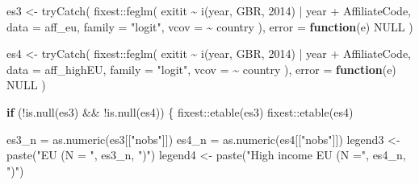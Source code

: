 \documentclass[
]{article}
\newenvironment{Shaded}{\begin{snugshade}}{\end{snugshade}}
\newcommand{\AttributeTok}[1]{\textcolor[rgb]{0.77,0.63,0.00}{#1}}
\newcommand{\ConstantTok}[1]{\textcolor[rgb]{0.00,0.00,0.00}{#1}}
\newcommand{\ControlFlowTok}[1]{\textcolor[rgb]{0.13,0.29,0.53}{\textbf{#1}}}
\newcommand{\DecValTok}[1]{\textcolor[rgb]{0.00,0.00,0.81}{#1}}
\newcommand{\FunctionTok}[1]{\textcolor[rgb]{0.00,0.00,0.00}{#1}}
\newcommand{\NormalTok}[1]{#1}
\newcommand{\OtherTok}[1]{\textcolor[rgb]{0.56,0.35,0.01}{#1}}
\newcommand{\SpecialCharTok}[1]{\textcolor[rgb]{0.00,0.00,0.00}{#1}}
\newcommand{\StringTok}[1]{\textcolor[rgb]{0.31,0.60,0.02}{#1}}
\begin{document}
\begin{Shaded}
\begin{Highlighting}[]
\NormalTok{es3 }\OtherTok{\textless{}{-}} \FunctionTok{tryCatch}\NormalTok{(}
\NormalTok{  fixest}\SpecialCharTok{::}\FunctionTok{feglm}\NormalTok{(}
\NormalTok{    exitit }\SpecialCharTok{\textasciitilde{}} \FunctionTok{i}\NormalTok{(year, GBR, }\DecValTok{2014}\NormalTok{) }\SpecialCharTok{|}\NormalTok{ year }\SpecialCharTok{+}\NormalTok{ AffiliateCode,}
    \AttributeTok{data =}\NormalTok{ aff\_eu,}
    \AttributeTok{family =} \StringTok{"logit"}\NormalTok{,}
    \AttributeTok{vcov =} \SpecialCharTok{\textasciitilde{}}\NormalTok{ country}
\NormalTok{  ),}
  \AttributeTok{error =} \ControlFlowTok{function}\NormalTok{(e) }\ConstantTok{NULL}
\NormalTok{)}

\NormalTok{es4 }\OtherTok{\textless{}{-}} \FunctionTok{tryCatch}\NormalTok{(}
\NormalTok{  fixest}\SpecialCharTok{::}\FunctionTok{feglm}\NormalTok{(}
\NormalTok{    exitit }\SpecialCharTok{\textasciitilde{}} \FunctionTok{i}\NormalTok{(year, GBR, }\DecValTok{2014}\NormalTok{) }\SpecialCharTok{|}\NormalTok{ year }\SpecialCharTok{+}\NormalTok{ AffiliateCode,}
    \AttributeTok{data =}\NormalTok{ aff\_highEU,}
    \AttributeTok{family =} \StringTok{"logit"}\NormalTok{,}
    \AttributeTok{vcov =} \SpecialCharTok{\textasciitilde{}}\NormalTok{ country}
\NormalTok{  ),}
  \AttributeTok{error =} \ControlFlowTok{function}\NormalTok{(e) }\ConstantTok{NULL}
\NormalTok{)}

\ControlFlowTok{if}\NormalTok{ (}\SpecialCharTok{!}\FunctionTok{is.null}\NormalTok{(es3) }\SpecialCharTok{\&\&} \SpecialCharTok{!}\FunctionTok{is.null}\NormalTok{(es4)) \{}
\NormalTok{  fixest}\SpecialCharTok{::}\FunctionTok{etable}\NormalTok{(es3)}
\NormalTok{  fixest}\SpecialCharTok{::}\FunctionTok{etable}\NormalTok{(es4)}

\NormalTok{  es3\_n }\OtherTok{=} \FunctionTok{as.numeric}\NormalTok{(es3[[}\StringTok{"nobs"}\NormalTok{]])}
\NormalTok{  es4\_n }\OtherTok{=} \FunctionTok{as.numeric}\NormalTok{(es4[[}\StringTok{"nobs"}\NormalTok{]])}
\NormalTok{  legend3 }\OtherTok{\textless{}{-}} \FunctionTok{paste}\NormalTok{(}\StringTok{"EU (N = "}\NormalTok{, es3\_n, }\StringTok{")"}\NormalTok{)}
\NormalTok{  legend4 }\OtherTok{\textless{}{-}} \FunctionTok{paste}\NormalTok{(}\StringTok{"High income EU (N ="}\NormalTok{, es4\_n, }\StringTok{")"}\NormalTok{)}


\end{Highlighting}
\end{Shaded}
\end{document}
